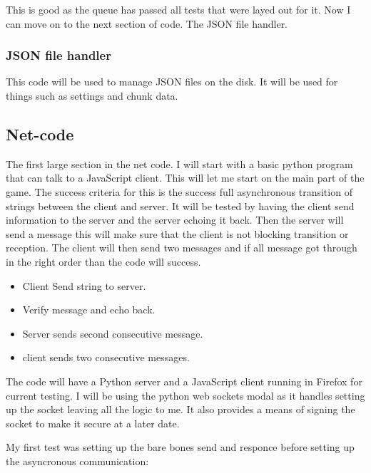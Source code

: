\documentclass[12pt]{article}
\begin{document}
This is good as the queue has passed all tests that were layed out for it. Now I can move on to the next section of code. The JSON file handler.

\subsubsection{JSON file handler}
This code will be used to manage JSON files on the disk. It will be used for things such as settings and chunk data. 


\subsection{Net-code}
The first large section in the net code. I will start with a basic python program that can talk to a JavaScript client. This will let me start on the main part of the game. The success criteria for this is the success full asynchronous transition of strings between the client and server. It will be tested by having the client send information to the server and the server echoing it back. Then the server will send a message this will make sure that the client is not blocking transition or reception. The client will then send two messages and if all message got through in the right order than the code will success.
\begin{itemize}
    \item Client Send string to server.
    \item Verify message and echo back.
    \item Server sends second consecutive message.
    \item client sends two consecutive messages.
\end{itemize}

The code will have a Python server and a JavaScript client running in Firefox for current testing. I will be using the python web sockets modal as it handles setting up the socket leaving all the logic to me. It also provides a means of signing the socket to make it secure at a later date.

My first test was setting up the bare bones send and responce before setting up the asyncronous communication:
\end{document}
